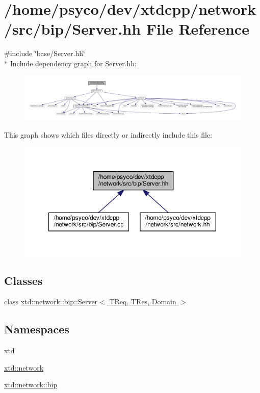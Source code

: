 \hypertarget{bip_2Server_8hh}{}\section{/home/psyco/dev/xtdcpp/network/src/bip/\+Server.hh File Reference}
\label{bip_2Server_8hh}
{\ttfamily \#include \char`\"{}base/\+Server.\+hh\char`\"{}}\\*
Include dependency graph for Server.\+hh\+:
\nopagebreak
\begin{figure}[H]
\begin{center}
\leavevmode
\includegraphics[width=350pt]{bip_2Server_8hh__incl}
\end{center}
\end{figure}
This graph shows which files directly or indirectly include this file\+:
\nopagebreak
\begin{figure}[H]
\begin{center}
\leavevmode
\includegraphics[width=350pt]{bip_2Server_8hh__dep__incl}
\end{center}
\end{figure}
\subsection*{Classes}
\begin{DoxyCompactItemize}
\item 
class \hyperlink{classxtd_1_1network_1_1bip_1_1Server}{xtd\+::network\+::bip\+::\+Server$<$ T\+Req, T\+Res, Domain $>$}
\end{DoxyCompactItemize}
\subsection*{Namespaces}
\begin{DoxyCompactItemize}
\item 
 \hyperlink{namespacextd}{xtd}
\item 
 \hyperlink{namespacextd_1_1network}{xtd\+::network}
\item 
 \hyperlink{namespacextd_1_1network_1_1bip}{xtd\+::network\+::bip}
\end{DoxyCompactItemize}
